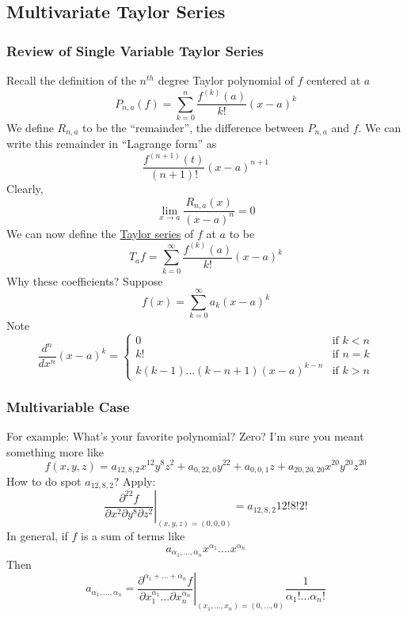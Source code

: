 \documentclass{article}
\begin{document}
\subsection{Multivariate Taylor Series}


\subsubsection{Review of Single Variable Taylor Series}
Recall the definition of the \(n^{th}\) degree Taylor polynomial of \(f\) centered at \(a\)
\[P_{n, a}(f) = \sum_{k = 0}^n\frac{f^{(k)}(a)}{k!}(x - a)^k\]
We define \(R_{n, a}\) to be the ``remainder'', the difference between \(P_{n, a}\) and \(f\). We can write this remainder in ``Lagrange form'' as
\[\frac{f^{(n + 1)}(t)}{(n + 1)!}(x - a)^{n + 1}\]
Clearly,
\[\lim_{x \to a}\frac{R_{n, a}(x)}{(x - a)^n} = 0\]
We can now define the \underline{Taylor series} of \(f\) at \(a\) to be
\[T_af = \sum_{k = 0}^\infty\frac{f^{(k)}(a)}{k!}(x - a)^k\]
Why these coefficients?
Suppose
\[f(x) = \sum_{k = 0}^\infty a_k(x - a)^k\]
Note
\[\frac{d^n}{dx^n}(x - a)^k = \left\{\begin{array}{cc}
  0 & \text{if } k < n \\
  k! & \text{if } n = k \\
  k(k - 1)...(k - n + 1)(x - a)^{k - n} & \text{if } k > n
\end{array}\right.\]

\subsubsection{Multivariable Case}
For example: What's your favorite polynomial? Zero? I'm sure you meant something more like
\[f(x, y, z) = a_{12,8,2}x^{12}y^8z^2 + a_{0,22,0}y^{22} + a_{0,0,1}z + a_{20,20,20}x^{20}y^{20}z^{20}\]
How to do spot \(a_{12, 8, 2}\)? Apply:
\[\left.\frac{\partial^{22}f}{\partial x^2 \partial y^8 \partial z^2}\right|_{(x, y, z) = (0, 0, 0)} = a_{12, 8, 2}12!8!2!\]
In general, if \(f\) is a sum of terms like
\[a_{\alpha_1,...,\alpha_n}x^{\alpha_1}....x^{\alpha_n}\]
Then
\[a_{\alpha_1,...,\alpha_n} = \left.\frac{\partial^{\alpha_1 + ... + \alpha_n}f}{\partial x_1^{\alpha_1} ... \partial x_n^{\alpha_n}}\right|_{(x_1,...,x_n) = (0,...,0)}\frac{1}{\alpha_1!...\alpha_n!}\]
\end{document}
